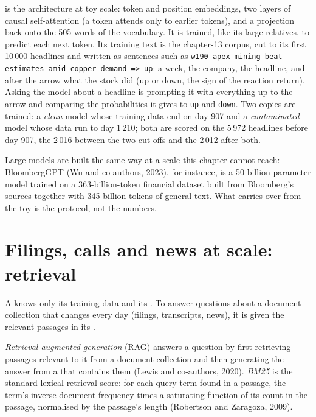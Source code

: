  is the architecture at toy scale: token and position embeddings, two layers of causal
self-attention (a token attends only to earlier tokens), and a projection back onto the 505 words of the vocabulary. It is
trained, like its large relatives, to predict each next token. Its training text is the chapter-13 corpus, cut to its first
10\,000 headlines and written as sentences such as \texttt{w190 apex mining beat estimates amid copper demand => up}: a week,
the company, the headline, and after the arrow what the stock did (up or down, the sign of the reaction return). Asking the
model about a headline is prompting it with everything up to the arrow and comparing the probabilities it gives to
\texttt{up} and \texttt{down}. Two copies are trained: a \emph{clean} model whose training data end on day 907 and a
\emph{contaminated} model whose data run to day 1\,210; both are scored on the 5\,972 headlines before day 907, the 2\,016
between the two cut-offs and the 2\,012 after both.

Large models are built the same way at a scale this chapter cannot reach: BloombergGPT (Wu and co-authors, 2023), for
instance, is a 50-billion-parameter model trained on a 363-billion-token financial dataset built from Bloomberg's sources
together with 345 billion tokens of general text. What carries over from the toy is the protocol, not the numbers.

\section{Filings, calls and news at scale: retrieval}

A  knows only its training data and its . To answer questions about a document collection that changes
every day (filings, transcripts, news), it is given the relevant passages in its .

\begin{definition}\label{def:ml:large-language-models-in-finance:rag}
\emph{Retrieval-augmented generation} (RAG) answers a question by first retrieving
passages relevant to it from a document collection and then generating the answer from a  that contains them (Lewis
and co-authors, 2020). \emph{BM25} is the standard lexical retrieval score: for each query term found in a
passage, the term's inverse document frequency times a saturating function of its count in the passage, normalised by the
passage's length (Robertson and Zaragoza, 2009).
\end{definition}

